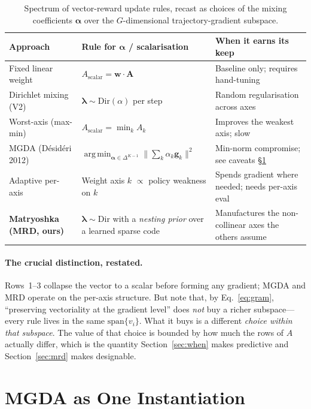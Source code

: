 \documentclass[11pt,a4paper]{article}
\newcommand{\argmin}{\operatorname*{arg\,min}}
\begin{document}
\begin{table}[h]
\centering
\caption{Spectrum of vector-reward update rules, recast as choices of the
mixing coefficients $\bm\alpha$ over the $G$-dimensional trajectory-gradient
subspace.}
\label{tab:spectrum}
\begin{tabular}{@{}lll@{}}
\toprule
\textbf{Approach} & \textbf{Rule for $\bm\alpha$ / scalarisation} & \textbf{When it earns its keep} \\
\midrule
Fixed linear weight &
  $A_{\mathrm{scalar}} = \bm{w} \cdot \bm{A}$ &
  Baseline only; requires hand-tuning \\[4pt]
Dirichlet mixing (V2) &
  $\bm{\lambda} \sim \mathrm{Dir}(\alpha)$ per step &
  Random regularisation across axes \\[4pt]
Worst-axis (max-min) &
  $A_{\mathrm{scalar}} = \min_k A_k$ &
  Improves the weakest axis; slow \\[4pt]
MGDA (D\'{e}sid\'{e}ri 2012) &
  $\argmin_{\bm{\alpha} \in \Delta^{K-1}} \|\sum_k \alpha_k \bm{g}_k\|^2$ &
  Min-norm compromise; see caveats \S\ref{sec:mgda} \\[4pt]
Adaptive per-axis &
  Weight axis $k$ $\propto$ policy weakness on $k$ &
  Spends gradient where needed; needs per-axis eval \\[4pt]
\textbf{Matryoshka (MRD, ours)} &
  $\bm\lambda \sim \mathrm{Dir}$ with a \emph{nesting prior} over a learned
  sparse code &
  Manufactures the non-collinear axes the others assume \\
\bottomrule
\end{tabular}
\end{table}

\paragraph{The crucial distinction, restated.}
Rows~1--3 collapse the vector to a scalar before forming any gradient; MGDA
and MRD operate on the per-axis structure.  But note that, by
Eq.~\eqref{eq:gram}, ``preserving vectoriality at the gradient level'' does
\emph{not} buy a richer subspace---every rule lives in the same
$\mathrm{span}\{v_i\}$.  What it buys is a different \emph{choice within that
subspace}.  The value of that choice is bounded by how much the rows of $A$
actually differ, which is the quantity Section~\ref{sec:when} makes
predictive and Section~\ref{sec:mrd} makes designable.

\section{MGDA as One Instantiation}
\label{sec:mgda}
\end{document}
